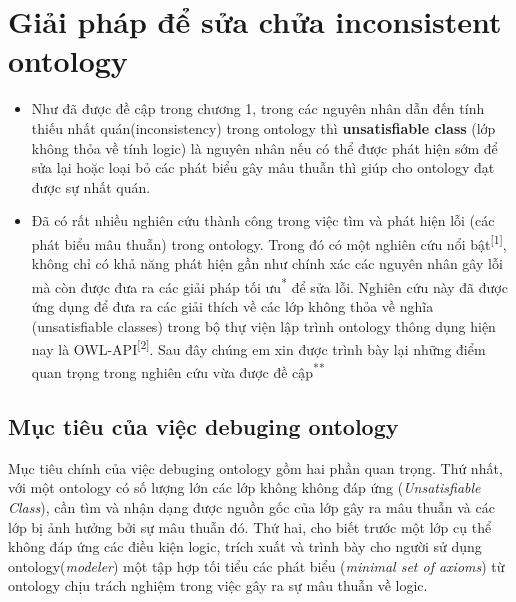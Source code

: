 \chapter{Giải pháp để sửa chửa inconsistent ontology}
{\let\thefootnote\relax{}
\let\thefootnote\relax{}
}
\begin{itemize}
\item
Như đã được đề cập trong chương 1, trong các nguyên nhân dẫn đến tính thiếu nhất quán(inconsistency) trong ontology thì \textbf{unsatisfiable class} (lớp không thỏa về tính logic) là nguyên nhân nếu có thể được phát hiện sớm để sửa lại hoặc loại bỏ các phát biểu gây mâu thuẫn thì giúp cho ontology đạt được sự nhất quán. 
\item
Đã có rất nhiều nghiên cứu thành công trong việc tìm và phát hiện lỗi (các phát biểu mâu thuẫn) trong ontology. Trong đó có một nghiên cứu nổi bật\textsuperscript{[1]}, không chỉ có khả năng phát hiện gần như chính xác các nguyên nhân gây lỗi mà còn được đưa ra các giải pháp tối ưu\textsuperscript{*} để sửa lỗi. Nghiên cứu này đã được ứng dụng để đưa ra các giải thích về các lớp không thỏa về nghĩa (unsatisfiable classes) trong bộ thự viện lập trình ontology thông dụng hiện nay là OWL-API\textsuperscript{[2]}. Sau đây chúng em xin được trình bày lại những điểm quan trọng trong nghiên cứu vừa được đề cập\textsuperscript{**}
\end{itemize}
\clearpage

\section{Mục tiêu của việc debuging ontology}
Mục tiêu chính của việc debuging ontology gồm hai phần quan trọng. Thứ nhất, với một ontology có số lượng lớn các lớp không không đáp ứng (\textit{Unsatisfiable Class}), cần tìm và nhận dạng được nguồn gốc của lớp gây ra mâu thuẫn và các lớp bị ảnh hưởng bởi sự mâu thuẫn đó. Thứ hai, cho biết trước một lớp cụ thể không đáp ứng các điều kiện logic, trích xuất và trình bày cho người sử dụng ontology(\textit{modeler}) một tập hợp tối tiểu các phát biểu (\textit{minimal set of axioms}) từ ontology chịu trách nghiệm trong việc gây ra sự mâu thuẫn về logic.
\\
